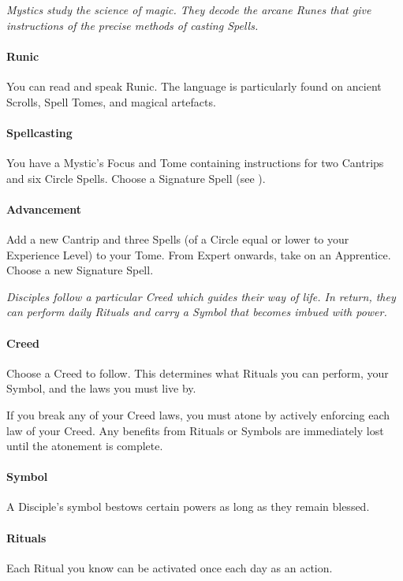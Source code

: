 \documentclass[itdr]{subfiles}
\begin{document}
\vfill

{\em Mystics study the science of magic. They decode the arcane Runes that give instructions of the precise methods of casting Spells.}

\paragraph{Runic}
You can read and speak Runic. The language is particularly found on ancient Scrolls, Spell Tomes, and magical artefacts.

\paragraph{Spellcasting}
You have a Mystic's Focus and Tome containing instructions for two Cantrips and six  Circle Spells. Choose a Signature Spell (see \textbf{}).

\paragraph{Advancement}
Add a new Cantrip and three Spells (of a Circle equal or lower to your Experience Level) to your Tome. From Expert onwards, take on an Apprentice. Choose a new Signature Spell.

\break

{\em Disciples follow a particular Creed which guides their way of life. In return, they can perform daily Rituals and carry a Symbol that becomes imbued with power.}

\paragraph{Creed}
Choose a Creed to follow. This determines what Rituals you can perform, your Symbol, and the laws you must live by.

If you break any of your Creed laws, you must atone by actively enforcing each law of your Creed. Any benefits from Rituals or Symbols are immediately lost until the atonement is complete.

\paragraph{Symbol}
A Disciple's symbol bestows certain powers as long as they remain blessed.

\paragraph{Rituals}
Each Ritual you know can be activated once each day as an action.
\end{document}
